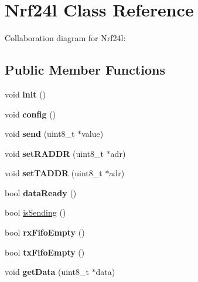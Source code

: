 \hypertarget{class_nrf24l}{}\section{Nrf24l Class Reference}
\label{class_nrf24l}


Collaboration diagram for Nrf24l\+:
\subsection*{Public Member Functions}
\begin{DoxyCompactItemize}
\item 
\mbox{\label{class_nrf24l_a4b960944859eeb927fcec158563b8c8c}} 
void {\bfseries init} ()
\item 
\mbox{\label{class_nrf24l_a605ec6860794bc29735cb7c6c9a59121}} 
void {\bfseries config} ()
\item 
\mbox{\label{class_nrf24l_a6798ef419d6cdfcbe57a49bcef6afef3}} 
void {\bfseries send} (uint8\+\_\+t $\ast$value)
\item 
\mbox{\label{class_nrf24l_a8fe19c3feaa8e698b51f6befbea7f539}} 
void {\bfseries set\+R\+A\+D\+DR} (uint8\+\_\+t $\ast$adr)
\item 
\mbox{\label{class_nrf24l_a6a43cd33e221f58181211c6dfd024b69}} 
void {\bfseries set\+T\+A\+D\+DR} (uint8\+\_\+t $\ast$adr)
\item 
\mbox{\label{class_nrf24l_aa7dc010fb525a61b844793466947bbe7}} 
bool {\bfseries data\+Ready} ()
\item 
bool \hyperlink{class_nrf24l_a897a4cfe23126a06ec5f5beb011fa3d9}{is\+Sending} ()
\item 
\mbox{\label{class_nrf24l_a5eeb62950b320cdf95e0645188fd5d09}} 
bool {\bfseries rx\+Fifo\+Empty} ()
\item 
\mbox{\label{class_nrf24l_a776c15c8e97e2c5780a2556734e5dd57}} 
bool {\bfseries tx\+Fifo\+Empty} ()
\item 
\mbox{\label{class_nrf24l_ad71b7f7a1506d4615e072a34aad82511}} 
void {\bfseries get\+Data} (uint8\+\_\+t $\ast$data)

\end{DoxyCompactItemize}
